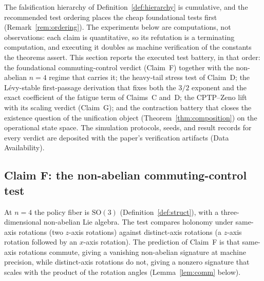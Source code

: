 \documentclass[11pt,a4paper]{article}
\theoremstyle{plain}
\theoremstyle{definition}
\theoremstyle{remark}
\newcommand{\SO}{\mathrm{SO}}
\begin{document}
The falsification hierarchy of Definition~\ref{def:hierarchy} is
cumulative, and the recommended test ordering places the cheap
foundational tests first (Remark~\ref{rem:ordering}). The
experiments below are computations, not observations: each claim is
quantitative, so its refutation is a terminating computation, and
executing it doubles as machine verification of the constants the
theorems assert. This section reports the executed test battery, in
that order: the foundational
commuting-control verdict (Claim~F) together with the non-abelian
$n=4$ regime that carries it; the heavy-tail stress test of
Claim~D; the L\'evy-stable first-passage derivation that fixes both
the $3/2$ exponent and the exact coefficient of the fatigue term of
Claims~C and~D; the CPTP--Zeno lift with its scaling verdict
(Claim~G); and the contraction battery that closes the existence
question of the unification object (Theorem~\ref{thm:composition})
on the operational state space. The simulation protocols, seeds,
and result records for every verdict are deposited with the paper's
verification artifacts (Data Availability).

\subsection{Claim F: the non-abelian commuting-control test}
\label{sec:verdict-f}

At $n=4$ the policy fiber is $\SO(3)$
(Definition~\ref{def:struct}), with a three-dimensional non-abelian
Lie algebra. The test compares holonomy under same-axis rotations
(two $z$-axis rotations) against distinct-axis rotations (a
$z$-axis rotation followed by an $x$-axis rotation). The
prediction of Claim~F is that same-axis rotations commute, giving a
vanishing non-abelian signature at machine precision, while
distinct-axis rotations do not, giving a nonzero signature that
scales with the product of the rotation angles
(Lemma~\ref{lem:comm} below).
\end{document}
